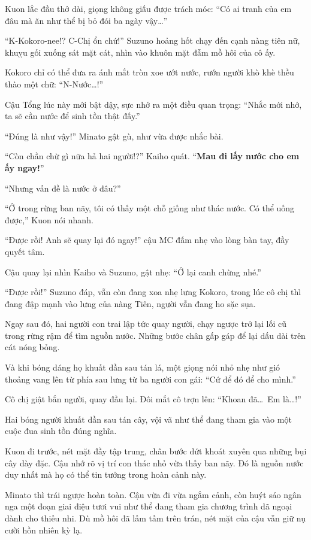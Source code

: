 \documentclass[../main.tex]{subfiles}
\begin{document}
Kuon lắc đầu thở dài, giọng không giấu được trách móc:  ``Có ai tranh của em đâu mà ăn như thể bị bỏ đói ba ngày vậy\dots''

``K-Kokoro-nee!? C-Chị ổn chứ!'' Suzuno hoảng hốt chạy đến cạnh nàng tiên nữ, khuỵu gối xuống sát mặt cát, nhìn vào khuôn mặt đẫm mồ hôi của cô ấy.

Kokoro chỉ có thể đưa ra ánh mắt tròn xoe ướt nước, rướn người khò khè thều thào một chữ: ``N-Nước\dots!''


Cậu Tổng lúc này mới bật dậy, sực nhớ ra một điều quan trọng: ``Nhắc mới nhớ, ta sẽ cần nước để sinh tồn thật đấy.''

``Đúng là như vậy!'' Minato gật gù, như vừa được nhắc bài.

``Còn chần chừ gì nữa hả hai người!?'' Kaiho quát. ``\textbf{Mau đi lấy nước cho em ấy ngay!}''

``Nhưng vấn đề là nước ở đâu?''

``Ở trong rừng ban nãy, tôi có thấy một chỗ giống như thác nước. Có thể uống được,'' Kuon nói nhanh.

``Được rồi! Anh sẽ quay lại đó ngay!'' cậu MC đấm nhẹ vào lòng bàn tay, đầy quyết tâm.

Cậu quay lại nhìn Kaiho và Suzuno, gật nhẹ: ``Ở lại canh chừng nhé.''

``Được rồi!'' Suzuno đáp, vẫn còn đang xoa nhẹ lưng Kokoro, trong lúc cô chị thì đang đập mạnh vào lưng của nàng Tiên, người vẫn đang ho sặc sụa.

Ngay sau đó, hai người con trai lập tức quay người, chạy ngược trở lại lối cũ trong rừng rậm để tìm nguồn nước. Những bước chân gấp gáp để lại dấu dài trên cát nóng bỏng.

Và khi bóng dáng họ khuất dần sau tán lá, một giọng nói nhỏ nhẹ như gió thoảng vang lên từ phía sau lưng từ ba người con gái: ``Cứ để đó để cho mình.''

Cô chị giật bắn người, quay đầu lại. Đôi mắt cô trợn lên:
``Khoan đã\dots\ Em là\dots!''

\ct

Hai bóng người khuất dần sau tán cây, vội vã như thể đang tham gia vào một cuộc đua sinh tồn đúng nghĩa.

Kuon đi trước, nét mặt đầy tập trung, chân bước dứt khoát xuyên qua những bụi cây dày đặc. Cậu nhớ rõ vị trí con thác nhỏ vừa thấy ban nãy. Đó là nguồn nước duy nhất mà họ có thể tin tưởng trong hoàn cảnh này.

Minato thì trái ngược hoàn toàn. Cậu vừa đi vừa ngắm cảnh, còn huýt sáo ngân nga một đoạn giai điệu tươi vui như thể đang tham gia chương trình dã ngoại dành cho thiếu nhi. Dù mồ hôi đã lấm tấm trên trán, nét mặt của cậu vẫn giữ nụ cười hồn nhiên kỳ lạ.
\end{document}
